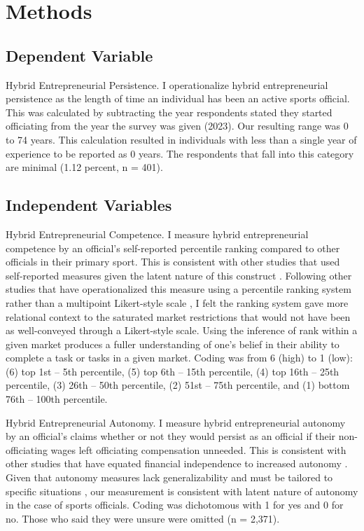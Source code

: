 \documentclass{article}
\begin{document}
\section{Methods}
 
\subsection{Dependent Variable}
Hybrid Entrepreneurial Persistence. I operationalize hybrid entrepreneurial persistence as the length of time an individual has been an active sports official. This was calculated by subtracting the year respondents stated they started officiating from the year the survey was given (2023).  Our resulting range was 0 to 74 years.  This calculation resulted in individuals with less than a single year of experience to be reported as 0 years.  The respondents that fall into this category are minimal (1.12 percent, n = 401).  

\subsection{Independent Variables}
Hybrid Entrepreneurial Competence. I measure hybrid entrepreneurial competence by an official’s self-reported percentile ranking compared to other officials in their primary sport.  This is consistent with other studies that used self-reported measures given the latent nature of this construct \cite{asante2022entrepreneurial, chen1998does, denoble1999entrepreneurial, pollack2019hybrid}.  Following other studies that have operationalized this measure using a percentile ranking system rather than a multipoint Likert-style scale \cite{kuhnen2018noncognitive}, I felt the ranking system gave more relational context to the saturated market restrictions that would not have been as well-conveyed through a Likert-style scale.  Using the inference of rank within a given market produces a fuller understanding of one’s belief in their ability to complete a task or tasks in a given market.  Coding was from 6 (high) to 1 (low): (6) top 1st – 5th percentile, (5) top 6th – 15th percentile, (4) top 16th – 25th percentile, (3) 26th – 50th percentile, (2) 51st – 75th percentile, and (1) bottom 76th – 100th percentile.  	

Hybrid Entrepreneurial Autonomy. I measure hybrid entrepreneurial autonomy by an official’s claims whether or not they would persist as an official if their non-officiating wages left officiating compensation unneeded.  This is consistent with other studies that have equated financial independence to increased autonomy \cite{howard2024guaranteed}.  Given that autonomy measures lack generalizability and must be tailored to specific situations \cite{lumpkin2009understanding}, our measurement is consistent with latent nature of autonomy in the case of sports officials.  Coding was dichotomous with 1 for yes and 0 for no.  Those who said they were unsure were omitted (n = 2,371).  	
\end{document}
